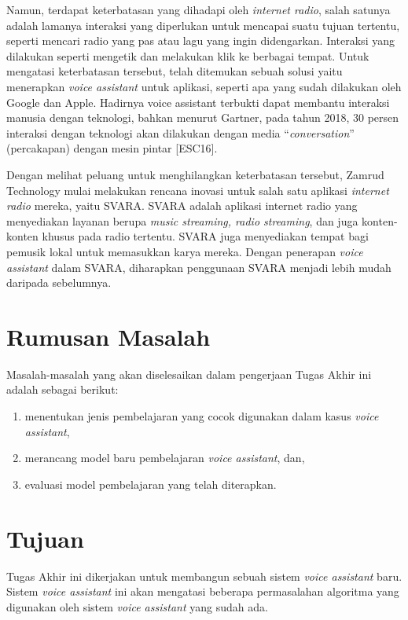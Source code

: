 Namun, terdapat keterbatasan yang dihadapi oleh \textit{internet radio}, salah satunya adalah lamanya interaksi yang diperlukan untuk mencapai suatu tujuan tertentu, seperti mencari radio yang pas atau lagu yang ingin didengarkan. Interaksi yang dilakukan seperti mengetik dan melakukan klik ke berbagai tempat. Untuk mengatasi keterbatasan tersebut, telah ditemukan sebuah solusi yaitu menerapkan \textit{voice assistant} untuk aplikasi, seperti apa yang sudah dilakukan oleh Google dan Apple. Hadirnya voice assistant terbukti dapat membantu interaksi manusia dengan teknologi, bahkan menurut Gartner, pada tahun 2018, 30 persen interaksi dengan teknologi akan dilakukan dengan media “\textit{conversation}” (percakapan) dengan mesin pintar [ESC16].

Dengan melihat peluang untuk menghilangkan keterbatasan tersebut, Zamrud Technology mulai melakukan rencana inovasi untuk salah satu aplikasi \textit{internet radio} mereka, yaitu SVARA. SVARA adalah aplikasi internet radio yang menyediakan layanan berupa \textit{music streaming, radio streaming}, dan juga konten-konten khusus pada radio tertentu. SVARA juga menyediakan tempat bagi pemusik lokal untuk memasukkan karya mereka. Dengan penerapan \textit{voice assistant} dalam SVARA, diharapkan penggunaan SVARA menjadi lebih mudah daripada sebelumnya.

\section{Rumusan Masalah}

Masalah-masalah yang akan diselesaikan dalam pengerjaan Tugas Akhir ini adalah sebagai berikut:

\begin{enumerate}
    \item menentukan jenis pembelajaran yang cocok digunakan dalam kasus \textit{voice assistant},
    \item merancang model baru pembelajaran \textit{voice assistant}, dan,
    \item evaluasi model pembelajaran yang telah diterapkan.
\end{enumerate}

\section{Tujuan}

Tugas Akhir ini dikerjakan untuk membangun sebuah sistem \textit{voice assistant} baru. Sistem \textit{voice assistant} ini akan mengatasi beberapa permasalahan algoritma yang digunakan oleh sistem \textit{voice assistant} yang sudah ada.

